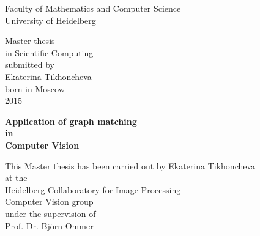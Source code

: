 \thispagestyle{empty}
\begin{center}
  \renewcommand{\baselinestretch}{2.00}
  \Large %
  Faculty of Mathematics and Computer Science\\
  \large University of Heidelberg
  \par\vfill\normalfont
  Master thesis\\
  in Scientific Computing\\
  submitted by\\
  Ekaterina Tikhoncheva\\
  born in Moscow\\
  2015
\end{center}
\newpage

\thispagestyle{empty}
\begin{center}
  \renewcommand{\baselinestretch}{2.00}
  \Large\bfseries %
    Application of graph matching\\
    in\\
    Computer Vision
  \par
  \vfill
  \large\normalfont
  This Master thesis has been carried out by Ekaterina Tikhoncheva\\
  at the\\
  Heidelberg Collaboratory for Image Processing\\
  Computer Vision group\\
  under the supervision of\\
  Prof. Dr. Björn Ommer
\end{center}\par
\vspace{5\baselineskip}

\onehalfspacing